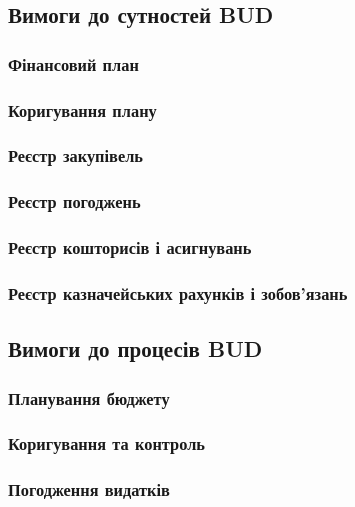 \subsection{Вимоги до сутностей BUD}

\subsubsection{Фінансовий план}

\subsubsection{Коригування плану}

\subsubsection{Реєстр закупівель}

\subsubsection{Реєстр погоджень}

\subsubsection{Реєстр кошторисів і асигнувань}

\subsubsection{Реєстр казначейських рахунків і зобов’язань}

\subsection{Вимоги до процесів BUD}

\subsubsection{Планування бюджету}

\subsubsection{Коригування та контроль}

\subsubsection{Погодження видатків}

